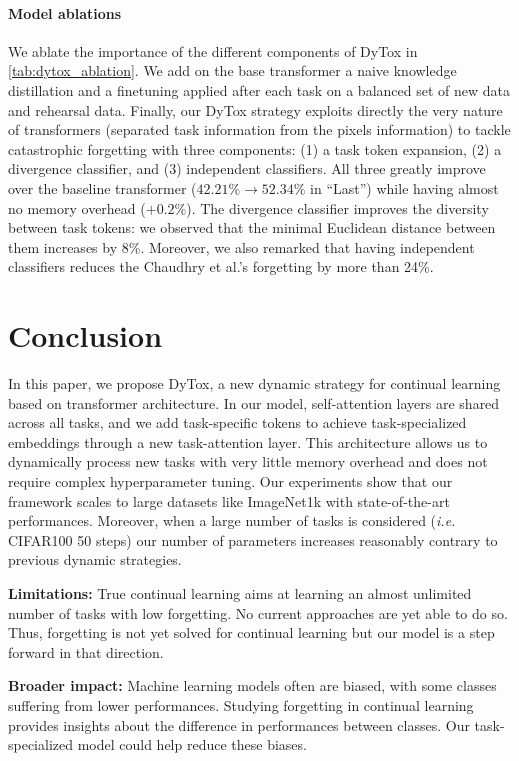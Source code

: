 \paragraph{Model ablations} We ablate the importance of the different components of DyTox in
\autoref{tab:dytox_ablation}. We add on the base transformer a naive knowledge distillation
\citep{hinton2015knowledge_distillation} and a finetuning
\citep{castro2018end_to_end_inc_learn,hou2019ucir,douillard2020podnet,yan2021der} applied after each
task on a balanced set of new data and rehearsal data. Finally, our DyTox strategy exploits directly
the very nature of transformers (separated task information from the pixels information) to tackle
catastrophic forgetting with three components: (1) a task token expansion, (2) a divergence
classifier, and (3) independent classifiers. All three greatly improve over the baseline transformer
($42.21\% \rightarrow 52.34\%$ in ``Last'') while having almost no memory overhead ($+0.2\%$). The
divergence classifier improves the diversity between task tokens: we observed that the minimal
Euclidean distance between them increases by 8\%. Moreover, we also remarked that having independent
classifiers reduces the Chaudhry et al.'s forgetting \citep{chaudhry2018riemannien_walk} by more than
24\%.




\section{Conclusion}

In this paper, we propose DyTox, a new dynamic strategy for continual learning based on transformer
architecture. In our model, self-attention layers are shared across all tasks, and we add
task-specific tokens to achieve task-specialized embeddings through a new task-attention layer.
This architecture allows us to dynamically process new tasks with very little memory overhead and
does not require complex hyperparameter tuning. Our experiments show that our framework scales to
large datasets like ImageNet1k with state-of-the-art performances. Moreover, when a large number of
tasks is considered (\textit{i.e.} CIFAR100 50 steps) our number of parameters increases reasonably
contrary to previous dynamic strategies.

\vspace{0.1cm}\noindent \textbf{Limitations:} True continual learning aims at learning an almost
unlimited number of tasks with low forgetting. No current approaches are yet able to do so. Thus,
forgetting is not yet solved for continual learning but our model is a step forward in that
direction.

\noindent \textbf{Broader impact:} Machine learning models often are biased, with some classes
suffering from lower performances. Studying forgetting in continual learning provides insights about
the difference in performances between classes. Our task-specialized model could help reduce these
biases.
